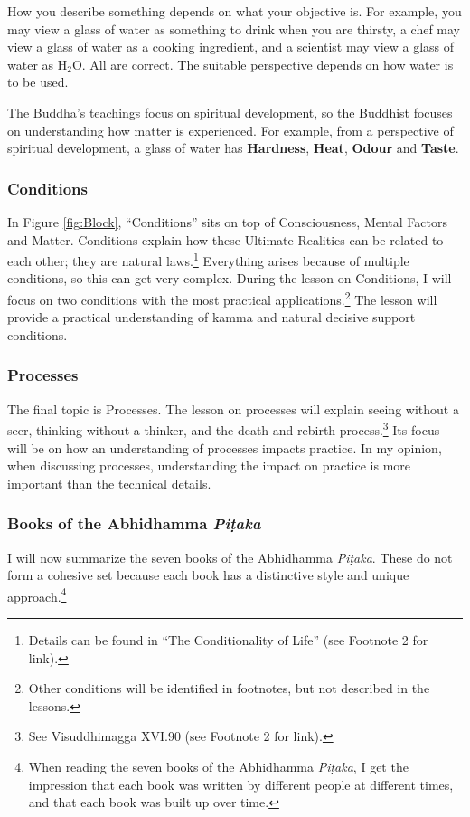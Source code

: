 How you describe something depends on what your objective is. For example, you may view a glass of water as something to drink when you are thirsty, a chef may view a glass of water as a cooking ingredient, and a scientist may view a glass of water as H$_{2}$O. All are correct. The suitable perspective depends on how water is to be used.

The Buddha’s teachings focus on spiritual development, so the Buddhist focuses on understanding how matter is experienced. For example, from a perspective of spiritual development, a glass of water has \textbf{Hardness}, \textbf{Heat}, \textbf{Odour} and \textbf{Taste}.

\subsubsection*{Conditions}

In Figure \ref{fig:Block}, “Conditions” sits on top of Consciousness, Mental Factors and Matter. Conditions explain how these Ultimate Realities can be related to each other; they are natural laws.\footnote{Details can be found in “The Conditionality of Life” (see Footnote 2 for link).} Everything arises because of multiple conditions, so this can get very complex. During the lesson on Conditions, I will focus on two conditions with the most practical applications.\footnote{Other conditions will be identified in footnotes, but not described in the lessons.} The lesson will provide a practical understanding of kamma and natural decisive support conditions. 

\subsubsection*{Processes}

The final topic is Processes. The lesson on processes will explain seeing without a seer, thinking without a thinker, and the death and rebirth process.\footnote{See Visuddhimagga XVI.90 (see Footnote 2 for link).} Its focus will be on how an understanding of processes impacts practice. In my opinion, when discussing processes, understanding the impact on practice is more important than the technical details.

\subsubsection*{Books of the Abhidhamma \textit{Piṭaka}}

I will now summarize the seven books of the Abhidhamma \textit{Piṭaka}. These do not form a cohesive set because each book has a distinctive style and unique approach.\footnote{When reading the seven books of the Abhidhamma \textit{Piṭaka}, I get the impression that each book was written by different people at different times, and that each book was built up over time.}

